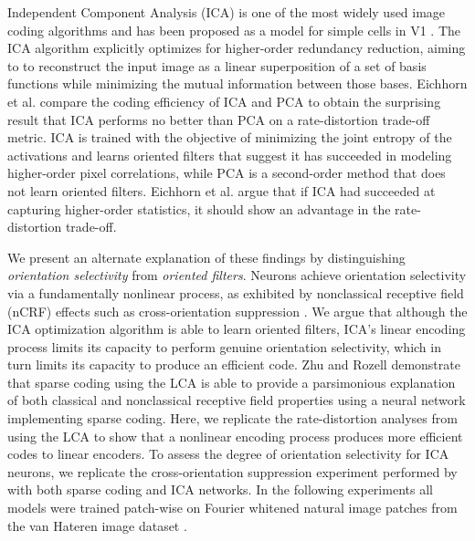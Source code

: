Independent Component Analysis (ICA) is one of the most widely used image coding algorithms and has been proposed as a model for simple cells in V1 \parencite{bell1997independent}. The ICA algorithm explicitly optimizes for higher-order redundancy reduction, aiming to to reconstruct the input image as a linear superposition of a set of basis functions while minimizing the mutual information between those bases. Eichhorn et al. \citeyearpar{eichhorn2009natural} compare the  coding efficiency of ICA and PCA to obtain the surprising result that ICA performs no better than PCA on a rate-distortion trade-off metric. ICA is trained with the objective of minimizing the joint entropy of the activations and learns oriented filters that suggest it has succeeded in modeling higher-order pixel correlations, while PCA is a second-order method that does not learn oriented filters. Eichhorn et al. \citeyearpar{eichhorn2009natural} argue that if ICA had succeeded at capturing higher-order statistics, it should show an advantage in the rate-distortion trade-off.

We present an alternate explanation of these findings by distinguishing \textit{orientation selectivity} from \textit{oriented filters}. Neurons achieve orientation selectivity via a fundamentally nonlinear process, as exhibited by nonclassical receptive field (nCRF) effects such as cross-orientation suppression \parencite{golden2016conjectures, zhu2013visual}. We argue that although the ICA optimization algorithm is able to learn oriented filters, ICA's linear encoding process limits its capacity to perform genuine orientation selectivity, which in turn limits its capacity to produce an efficient code. Zhu and Rozell \citeyearpar{zhu2013visual} demonstrate that sparse coding using the LCA is able to provide a parsimonious explanation of both classical and nonclassical receptive field properties using a neural network implementing sparse coding. Here, we replicate the rate-distortion analyses from \parencite{eichhorn2009natural} using the LCA to show that a nonlinear encoding process produces more efficient codes to linear encoders. To assess the degree of orientation selectivity for ICA neurons, we replicate the cross-orientation suppression experiment performed by \parencite{zhu2013visual} with both sparse coding and ICA networks. In the following experiments all models were trained patch-wise on Fourier whitened natural image patches from the van Hateren image dataset \parencite{hateren1998independent}.


